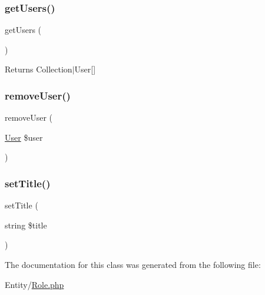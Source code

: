 \mbox{\label{class_app_1_1_entity_1_1_role_a0fc10b64683021b70c7eb95fb514c119}} 
\subsubsection{\texorpdfstring{getUsers()}{getUsers()}}
{\footnotesize\ttfamily get\+Users (\begin{DoxyParamCaption}{ }\end{DoxyParamCaption})}

\begin{DoxyReturn}{Returns}
Collection$\vert$\+User\mbox{[}\mbox{]} 
\end{DoxyReturn}
\mbox{\label{class_app_1_1_entity_1_1_role_aa668d0594f02dc524f8a92e4f4625ae3}} 
\subsubsection{\texorpdfstring{removeUser()}{removeUser()}}
{\footnotesize\ttfamily remove\+User (\begin{DoxyParamCaption}\item[{\mbox{\hyperlink{class_app_1_1_entity_1_1_user}{User}}}]{\$user }\end{DoxyParamCaption})}

\mbox{\label{class_app_1_1_entity_1_1_role_a754ef3032cc3ffb25ad2d1a13720fc29}} 
\subsubsection{\texorpdfstring{setTitle()}{setTitle()}}
{\footnotesize\ttfamily set\+Title (\begin{DoxyParamCaption}\item[{string}]{\$title }\end{DoxyParamCaption})}



The documentation for this class was generated from the following file\+:\begin{DoxyCompactItemize}
\item 
Entity/\mbox{\hyperlink{_role_8php}{Role.\+php}}\end{DoxyCompactItemize}
